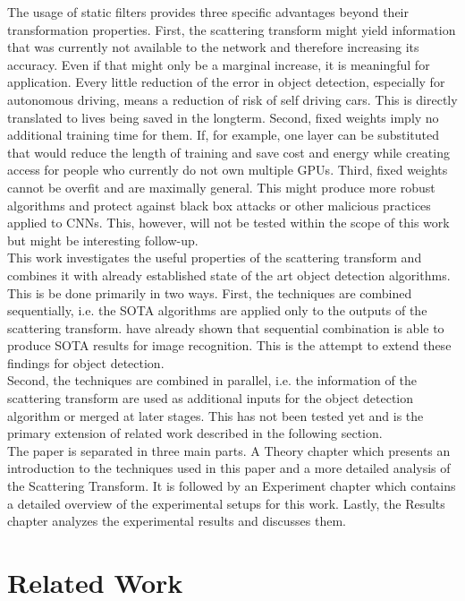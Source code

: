 The usage of static filters provides three specific advantages beyond their transformation properties. First, the scattering transform might yield information that was currently not available to the network and therefore increasing its accuracy. Even if that might only be a marginal increase, it is meaningful for application. Every little reduction of the error in object detection, especially for autonomous driving, means a reduction of risk of self driving cars. This is directly translated to lives being saved in the longterm. 
Second, fixed weights imply no additional training time for them. If, for example, one layer can be substituted that would reduce the length of training and save cost and energy while creating access for people who currently do not own multiple GPUs.
Third, fixed weights cannot be overfit and are maximally general. This might produce more robust algorithms and protect against black box attacks or other malicious practices applied to CNNs. This, however, will not be tested within the scope of this work but might be interesting follow-up.\\
This work investigates the useful properties of the scattering transform and combines it with already established state of the art object detection algorithms. This is be done primarily in two ways. First, the techniques are combined sequentially, i.e. the SOTA algorithms are applied only to the outputs of the scattering transform. \cite{ScalingTheScatteringTransform2017}
have already shown that sequential combination is able to produce SOTA results for image recognition. This is the attempt to extend these findings for object detection. \\
Second, the techniques are combined in parallel, i.e. the information of the scattering transform are used as additional inputs for the object detection algorithm or merged at later stages. This has not been tested yet and is the primary extension of related work described in the following section.\\
The paper is separated in three main parts. A Theory chapter which presents an introduction to the techniques used in this paper and a more detailed analysis of the Scattering Transform. It is followed by an Experiment chapter which contains a detailed overview of the experimental setups for this work. Lastly, the Results chapter analyzes the experimental results and discusses them. 


\section{Related Work}

